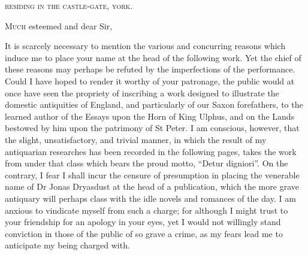 \noindent\MakeLowercase{\textsc{Residing in the Castle-Gate, York.}}

\lettrine{M}{uch} esteemed and dear Sir,
\baselineskip

It is scarcely necessary to mention the various and concurring reasons
which induce me to place your name at the head of the following work.
Yet the chief of these reasons may perhaps be refuted by the
imperfections of the performance. Could I have hoped to render it worthy
of your patronage, the public would at once have seen the propriety of
inscribing a work designed to illustrate the domestic antiquities of
England, and particularly of our Saxon forefathers, to the learned
author of the Essays upon the Horn of King Ulphus, and on the Lands
bestowed by him upon the patrimony of St Peter. I am conscious, however,
that the slight, unsatisfactory, and trivial manner, in which the result
of my antiquarian researches has been recorded in the following pages,
takes the work from under that class which bears the proud motto,
``Detur digniori''. On the contrary, I fear I shall incur the censure of
presumption in placing the venerable name of Dr Jonas Dryasdust at the
head of a publication, which the more grave antiquary will perhaps class
with the idle novels and romances of the day. I am anxious to vindicate
myself from such a charge; for although I might trust to your friendship
for an apology in your eyes, yet I would not willingly stand conviction
in those of the public of so grave a crime, as my fears lead me to
anticipate my being charged with.

